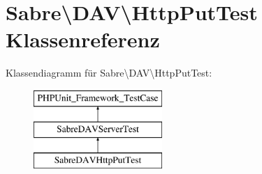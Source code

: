 \hypertarget{class_sabre_1_1_d_a_v_1_1_http_put_test}{}\section{Sabre\textbackslash{}D\+AV\textbackslash{}Http\+Put\+Test Klassenreferenz}
\label{class_sabre_1_1_d_a_v_1_1_http_put_test}
Klassendiagramm für Sabre\textbackslash{}D\+AV\textbackslash{}Http\+Put\+Test\+:\begin{figure}[H]
\begin{center}
\leavevmode
\includegraphics[height=3.000000cm]{class_sabre_1_1_d_a_v_1_1_http_put_test}
\end{center}
\end{figure}
